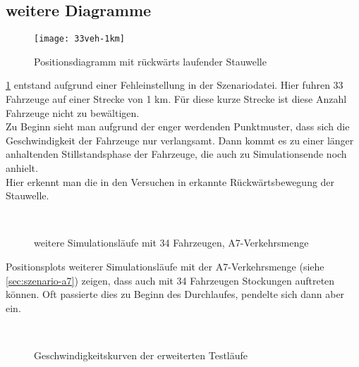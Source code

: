 \newpage

\subsection{weitere Diagramme}


\begin{figure}[hptb]
 \centering
 \texttt{[image: 33veh-1km]}
 \caption{Positionsdiagramm mit rückwärts laufender Stauwelle}
 \label{figure:33veh-1km}
\end{figure}

\cref{figure:33veh-1km} entstand aufgrund einer Fehleinstellung in der Szenariodatei.
Hier fuhren 33 Fahrzeuge auf einer Strecke von 1 km.
Für diese kurze Strecke ist diese Anzahl Fahrzeuge nicht zu bewältigen.
\\
Zu Beginn sieht man aufgrund der enger werdenden Punktmuster, dass sich die Geschwindigkeit der Fahrzeuge nur verlangsamt. Dann kommt es zu einer länger anhaltenden Stillstandsphase der Fahrzeuge, die auch zu Simulationsende noch anhielt.
\\
Hier erkennt man die in den Versuchen in \cite{na-sch} erkannte Rückwärtsbewegung der Stauwelle.


\newpage


\begin{figure}[hptb]
  \centering
    \\
  \caption{weitere Simulationsläufe mit 34 Fahrzeugen, A7-Verkehrsmenge}
  \label{figure:a7-34veh-more}
\end{figure}

Positionsplots weiterer Simulationsläufe mit der A7-Verkehrsmenge (siehe \cref{sec:szenario-a7}) zeigen, dass auch mit 34 Fahrzeugen Stockungen auftreten können.
Oft passierte dies zu Beginn des Durchlaufes, pendelte sich dann aber ein.


\newpage


\begin{figure}[hptb]
  \centering
   \qquad 
   \qquad 
    \\
  \caption{Geschwindigkeitskurven der erweiterten Testläufe}
  \label{figure:short-a7}
\end{figure}

